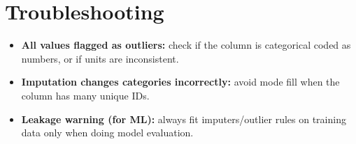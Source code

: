 \documentclass[11pt]{article}
\begin{document}
\section{Troubleshooting}
\begin{itemize}[leftmargin=*]
  \item \textbf{All values flagged as outliers:} check if the column is categorical coded as numbers, or if units are inconsistent.
  \item \textbf{Imputation changes categories incorrectly:} avoid mode fill when the column has many unique IDs.
  \item \textbf{Leakage warning (for ML):} always fit imputers/outlier rules on training data only when doing model evaluation.
\end{itemize}

\notesources{\AIMLLabSources}
\end{document}
